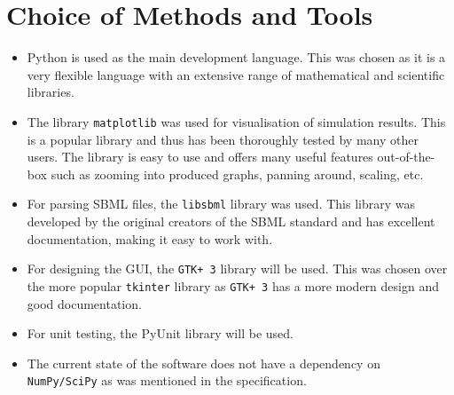 \documentclass{article}
\begin{document}
	\section{Choice of Methods and Tools}
	\begin{itemize}
		\item Python is used as the main development language. This was chosen as it is a very flexible language with an extensive range of mathematical and scientific libraries.
		\item The library \verb|matplotlib| was used for visualisation of simulation results. This is a popular library and thus has been thoroughly tested by many other users. The library is easy to use and offers many useful features out-of-the-box such as zooming into produced graphs, panning around, scaling, etc.
		\item For parsing SBML files, the \verb|libsbml| library was used. This library was developed by the original creators of the SBML standard and has excellent documentation, making it easy to work with.
		\item For designing the GUI, the \verb|GTK+ 3| library will be used. This was chosen over the more popular \verb|tkinter| library as \verb|GTK+ 3| has a more modern design and good documentation.
		\item For unit testing, the PyUnit library will be used.
		\item The current state of the software does not have a dependency on \verb|NumPy/SciPy| as was mentioned in the specification.
	\end{itemize}
	
	
	
	
	
	
\end{document}
